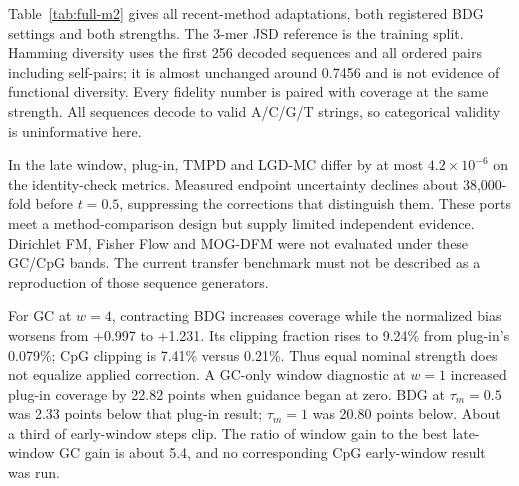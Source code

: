\documentclass{article}
\begin{document}
Table~\ref{tab:full-m2} gives all recent-method adaptations, both registered BDG settings and both strengths. The 3-mer JSD reference is the training split. Hamming diversity uses the first 256 decoded sequences and all ordered pairs including self-pairs; it is almost unchanged around 0.7456 and is not evidence of functional diversity. Every fidelity number is paired with coverage at the same strength. All sequences decode to valid A/C/G/T strings, so categorical validity is uninformative here.

In the late window, plug-in, TMPD and LGD-MC differ by at most $4.2\times10^{-6}$ on the identity-check metrics. Measured endpoint uncertainty declines about 38,000-fold before $t=0.5$, suppressing the corrections that distinguish them. These ports meet a method-comparison design but supply limited independent evidence. Dirichlet FM, Fisher Flow and MOG-DFM were not evaluated under these GC/CpG bands. The current transfer benchmark must not be described as a reproduction of those sequence generators.

For GC at $w=4$, contracting BDG increases coverage while the normalized bias worsens from +0.997 to +1.231. Its clipping fraction rises to 9.24\% from plug-in's 0.079\%; CpG clipping is 7.41\% versus 0.21\%. Thus equal nominal strength does not equalize applied correction. A GC-only window diagnostic at $w=1$ increased plug-in coverage by 22.82 points when guidance began at zero. BDG at $\tau_m=0.5$ was 2.33 points below that plug-in result; $\tau_m=1$ was 20.80 points below. About a third of early-window steps clip. The ratio of window gain to the best late-window GC gain is about 5.4, and no corresponding CpG early-window result was run.
\end{document}
